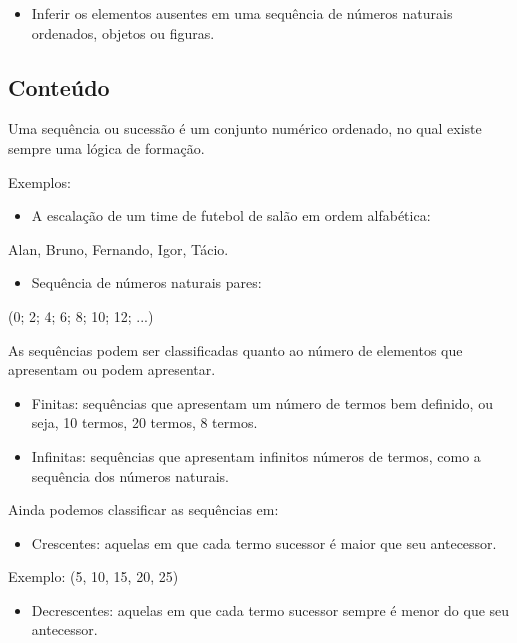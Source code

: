 \begin{escolha}
\begin{itemize}
    \item Inferir os elementos ausentes em uma sequência de números naturais
ordenados, objetos ou figuras.
\end{itemize}


\subsection{Conteúdo}\label{conteuxfado-2}

Uma sequência ou sucessão é um conjunto numérico ordenado, no qual existe sempre uma lógica de formação.

Exemplos:

\begin{itemize}
\item
  A escalação de um time de futebol de salão em ordem alfabética:
\end{itemize}

Alan, Bruno, Fernando, Igor, Tácio.

\begin{itemize}
\item
  Sequência de números naturais pares:
\end{itemize}

(0; 2; 4; 6; 8; 10; 12; ...)

As sequências podem ser classificadas quanto ao número de elementos que apresentam ou podem apresentar.

\begin{itemize}
\item
  Finitas: sequências que apresentam um número de termos bem definido,
  ou seja, 10 termos, 20 termos, 8 termos.
\item
  Infinitas: sequências que apresentam infinitos números de termos, como a sequência dos números naturais.
\end{itemize}

Ainda podemos classificar as sequências em:

\begin{itemize}
\item
  Crescentes: aquelas em que cada termo sucessor é maior que seu antecessor.
\end{itemize}

Exemplo: (5, 10, 15, 20, 25)

\begin{itemize}
\item
  Decrescentes: aquelas em que cada termo sucessor sempre é menor do que seu antecessor.
\end{itemize}


\end{escolha}
